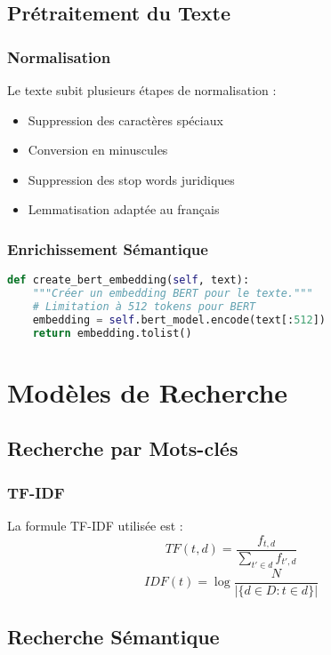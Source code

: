 \documentclass[12pt,a4paper]{article}
\begin{document}
\subsection{Prétraitement du Texte}
\subsubsection{Normalisation}
Le texte subit plusieurs étapes de normalisation :
\begin{itemize}
    \item Suppression des caractères spéciaux
    \item Conversion en minuscules
    \item Suppression des stop words juridiques
    \item Lemmatisation adaptée au français
\end{itemize}

\subsubsection{Enrichissement Sémantique}
\begin{lstlisting}[language=Python, caption=Création des embeddings BERT]
def create_bert_embedding(self, text):
    """Créer un embedding BERT pour le texte."""
    # Limitation à 512 tokens pour BERT
    embedding = self.bert_model.encode(text[:512])
    return embedding.tolist()
\end{lstlisting}

\section{Modèles de Recherche}

\subsection{Recherche par Mots-clés}
\subsubsection{TF-IDF}
La formule TF-IDF utilisée est :
\begin{equation}
    TF(t,d) = \frac{f_{t,d}}{\sum_{t' \in d} f_{t',d}}
\end{equation}
\begin{equation}
    IDF(t) = \log\frac{N}{|\{d \in D: t \in d\}|}
\end{equation}

\subsection{Recherche Sémantique}
\end{document}
